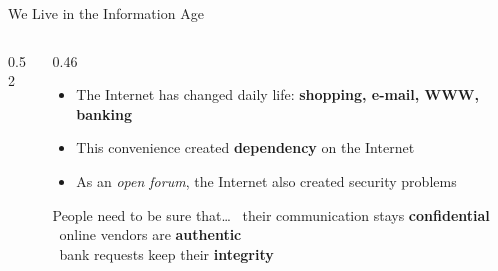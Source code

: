 \documentclass[aspectratio=169,11pt,xcolor={table}]{beamer}
\newcommand{\hl}[1]{\textcolor{ocean}{\textbf{#1}}}
\newcommand{\bad}[1]{\textcolor{brick}{\textbf{#1}}}
\begin{document}
\begin{frame}{We Live in the Information Age}
  \begin{columns}[c]
    \begin{column}{0.52\textwidth}
      \centering
    \end{column}
    \begin{column}{0.46\textwidth}
      \begin{itemize}\setlength{\itemsep}{4pt}
        \item The Internet has changed daily life: \hl{shopping, e-mail, WWW, banking}
        \item This convenience created \bad{dependency} on the Internet
        \item As an \emph{open forum}, the Internet also created security problems
      \end{itemize}
      \vspace{2mm}
      \begin{block}{People need to be sure that\dots}
        \small
        \textbullet~their communication stays \textbf{confidential}\\
        \textbullet~online vendors are \textbf{authentic}\\
        \textbullet~bank requests keep their \textbf{integrity}
      \end{block}
    \end{column}
  \end{columns}
\end{frame}
\end{document}
